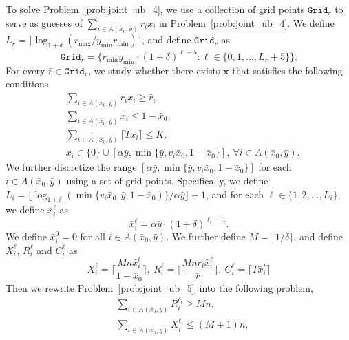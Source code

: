 \documentclass[mnsc,non-blindrev]{informs3}
\theoremstyle{definition}
\begin{document}
\begin{appendices}{\Large{}}
{To solve Problem~\eqref{prob:joint_ub_4}, we use a collection of grid points $\texttt{Grid}_r$ to serve as guesses of $\sum_{i\in A(\bar{x}_0,\bar{y})}r_ix_i$ in Problem~\eqref{prob:joint_ub_4}. We define $L_r=\lceil\log_{1+\delta}(r_{\max}/y_{\min}r_{\min})\rceil$, and define $\texttt{Grid}_r$ as
\begin{equation*}
\texttt{Grid}_r=\{r_{\min}y_{\min}\cdot(1+\delta)^{\ell-5}:\ell\in\{0,1,\dots,L_r+5\}\}.
\end{equation*}
For every $\bar{r}\in \texttt{Grid}_r$, we study whether there exists $\bm{x}$ that satisfies the following conditions
\begin{equation}\label{prob:joint_ub_5}
\begin{aligned}
&\sum_{i\in A(\bar{x}_0,\bar{y})}r_ix_i\geq \bar{r},\\
&\sum_{i\in A(\bar{x}_0,\bar{y})} x_i\leq 1-\bar{x}_0,\\
&\sum_{i\in A(\bar{x}_0,\bar{y})}\lceil Tx_i\rceil\leq K,\\
&x_i\in\{0\}\cup[\alpha \bar{y},\min\{\bar{y},v_i\bar{x}_0,1-\bar{x}_0\}],\ \forall i\in A(\bar{x}_0,\bar{y}).
\end{aligned}
\end{equation}
We further discretize the range $[\alpha\bar{y},\min\{\bar{y},v_i\bar{x}_0,1-\bar{x}_0\}]$ for each $i\in A(\bar{x}_0,\bar{y})$ using a set of grid points. Specifically, we define $L_i=\lfloor\log_{1+\delta}(\min\{v_i\bar{x}_0,\bar{y},1-\bar{x}_0)\}/\alpha\bar{y}\rfloor+1$, and for each $\ell\in\{1,2,\dots,L_i\}$, we define $\bar{x}_i^\ell$ as
\begin{equation*}
\bar{x}_i^\ell=\alpha\bar{y}\cdot (1+\delta)^{\ell_i-1}.
\end{equation*}
We define $\bar{x}_i^0=0$ for all $i\in A(\bar{x}_0,\bar{y})$. We further define $M=\lceil1/\delta\rceil$, and define $X_i^\ell$, $R_i^\ell$ and $C_i^\ell$ as
\begin{equation*}
X_i^\ell=\Big\lceil\dfrac{Mn\bar{x}_i^\ell}{1-\bar{x}_0}\Big\rceil,\ R_i^\ell=\Big\lfloor \dfrac{Mnr_i\bar{x}_i^\ell}{\bar{r}}\Big\rfloor,\ C_i^\ell=\lceil T\bar{x}_i^\ell\rceil
\end{equation*}
Then we rewrite Problem~\eqref{prob:joint_ub_5}~into the following problem,
\begin{equation}
\begin{aligned}
&\sum_{i\in A(\bar{x}_0,\bar{y})} R_i^{\ell_i}\geq Mn,\\
&\sum_{i\in A(\bar{x}_0,\bar{y})} X_i^{\ell_i}\leq (M+1)n,\\

\end{aligned}
\end{equation}}
\end{appendices}
\end{document}
